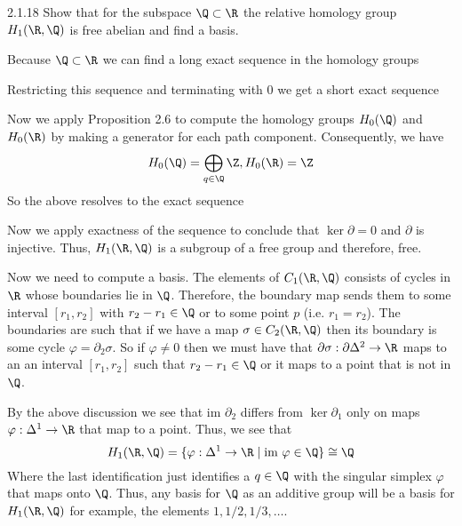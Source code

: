 \documentclass{article}
\newcommand{\im}{\text{im }}
\begin{document}
\begin{exercise}{2.1.18}{\parindent}
  Show that for the subspace $\Q \subset \R$ the relative homology
  group $H_1(\R,\Q)$ is free abelian and find a basis.
\end{exercise}
\begin{solution}{\parindent}
  Because $\Q \subset \R$ we can find a long exact sequence in the
  homology groups
  \begin{center}
  \end{center}
  Restricting this sequence and terminating with 0 we get a short
  exact sequence
  \begin{center}
  \end{center}
  Now we apply Proposition 2.6 to compute the homology groups
  $H_0(\Q)$ and $H_0(\R)$ by making a generator for each path
  component. Consequently, we have 
  \[
  H_0(\Q) = \bigoplus_{q \in \Q} \Z, H_0(\R) = \Z
  \]
  So the above resolves to the exact sequence
  \begin{center}
  \end{center}
  Now we apply exactness of the sequence to conclude that
  $\ker \partial = 0$ and $\partial$ is injective. Thus, $H_1(\R, \Q)$
  is a subgroup of a free group and therefore, free.

  Now we need to compute a basis. The elements of $C_1(\R,\Q)$
  consists of cycles in $\R$ whose boundaries lie in $\Q$. Therefore,
  the boundary map sends them to some interval $[r_1,r_2]$ with $r_2 -
  r_1 \in \Q$ or to some point $p$ (i.e. $r_1 = r_2$). The boundaries
  are such that if we have a map $\sigma \in C_2(\R,\Q)$ then its
  boundary is some cycle $\varphi = \partial_2\sigma$. So if $\varphi
  \neq 0$ then we must have that $\partial \sigma: \partial\Delta^2
  \to \R$ maps to an an interval $[r_1,r_2]$ such that $r_2-r_1 \in
  \Q$ or it maps to a point that is not in $\Q$.

  By the above discussion we see that $\im \partial_2$ differs from
  $\ker \partial_1$ only on maps $\varphi: \Delta^1 \to \R$ that map
  to a point. Thus, we see that
  \[
  H_1(\R,\Q) = \lbrace \varphi:\Delta^1 \to \R \mid \im \varphi \in
  \Q\rbrace \cong \Q
  \]
  Where the last identification just identifies a $q \in \Q$ with the
  singular simplex $\varphi$ that maps onto $\Q$. Thus, any basis for
  $\Q$ as an additive group will be a basis for $H_1(\R,\Q)$ for
  example, the elements $1,1/2,1/3,\ldots$.
\end{solution}
\end{document}
